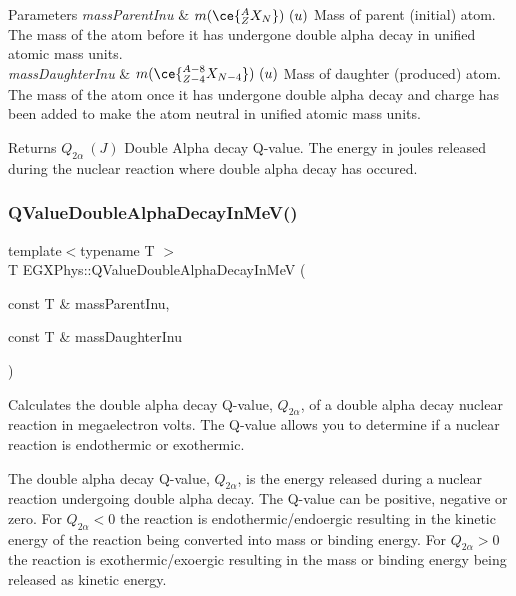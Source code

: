 \begin{DoxyParams}{Parameters}
{\em mass\+Parent\+Inu} & $m(\ce{ ^{A}_{Z}X_{N} })\ (u)$ Mass of parent (initial) atom. The mass of the atom before it has undergone double alpha decay in unified atomic mass units. \\
\hline
{\em mass\+Daughter\+Inu} & $m(\ce{ ^{A-8}_{Z{-4}}X_{N-4} })\ (u)$ Mass of daughter (produced) atom. The mass of the atom once it has undergone double alpha decay and charge has been added to make the atom neutral in unified atomic mass units. \\
\hline
\end{DoxyParams}
\begin{DoxyReturn}{Returns}
$Q_{2\alpha}\ (J)$ Double Alpha decay Q-\/value. The energy in joules released during the nuclear reaction where double alpha decay has occured. 
\end{DoxyReturn}
\mbox{\label{group___e_g_x_phys-_q_value_ga9bc6e8f493ee3769eb6eea0ac7cbdc61}} 
\subsubsection{\texorpdfstring{Q\+Value\+Double\+Alpha\+Decay\+In\+Me\+V()}{QValueDoubleAlphaDecayInMeV()}}
{\footnotesize\ttfamily template$<$typename T $>$ \\
T E\+G\+X\+Phys\+::\+Q\+Value\+Double\+Alpha\+Decay\+In\+MeV (\begin{DoxyParamCaption}\item[{const T \&}]{mass\+Parent\+Inu,  }\item[{const T \&}]{mass\+Daughter\+Inu }\end{DoxyParamCaption})}



Calculates the double alpha decay Q-\/value, $Q_{2\alpha}$, of a double alpha decay nuclear reaction in megaelectron volts. The Q-\/value allows you to determine if a nuclear reaction is endothermic or exothermic. 

The double alpha decay Q-\/value, $Q_{2\alpha}$, is the energy released during a nuclear reaction undergoing double alpha decay. The Q-\/value can be positive, negative or zero. For $Q_{2\alpha} < 0$ the reaction is endothermic/endoergic resulting in the kinetic energy of the reaction being converted into mass or binding energy. For $Q_{2\alpha} > 0$ the reaction is exothermic/exoergic resulting in the mass or binding energy being released as kinetic energy.

